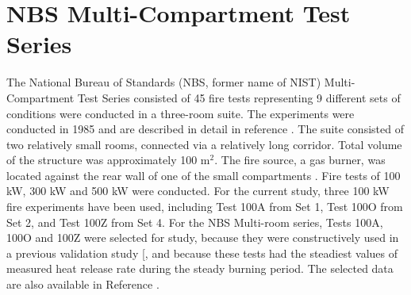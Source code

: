 \clearpage

\section{NBS Multi-Compartment Test Series}

The National Bureau of Standards (NBS, former name of NIST) Multi-Compartment Test Series consisted of 45 fire tests representing 9 different sets of conditions were conducted in a three-room suite.  The experiments were conducted in 1985 and are described in detail in reference \cite{Peacock:1988}.  The suite consisted of two relatively small rooms, connected via a relatively long corridor. Total volume of the structure was approximately 100 m$^2$. The fire source, a gas burner, was located against the rear wall of one of the small compartments . Fire tests of 100 kW, 300 kW and 500 kW were conducted. For the current  study, three 100 kW fire experiments have been used, including Test 100A from Set 1, Test 100O from Set 2, and Test 100Z from Set 4. For the NBS Multi-room series, Tests 100A, 100O and 100Z were selected for study, because they were constructively used in a previous validation study [\cite{EPRI}, and because these tests had  the steadiest values of measured heat release rate during the steady burning period. The selected data are also available in Reference \cite{EPRI}. 

